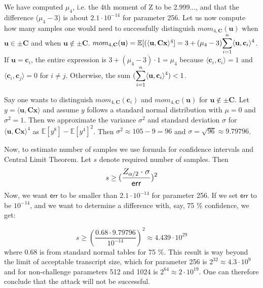 \documentclass[12 pt]{article}        	%
\newcommand{\mat}[1]{\mathbf{#1}}
\renewcommand{\vec}[1]{\mathbf{#1}}
\newcommand{\bb}[1]{\mathbb{#1}}
\begin{document}
We have computed $\mu_4$, i.e. the 4th moment of Z to be 2.999..., and that the difference ($\mu_4 - 3$) is about $2.1 \cdot 10^{-14}$ for parameter 256.
Let us now compute how many samples one would need to successfully distinguish $mom_{4, \mat{C}}(\vec{u})$ when $\vec{u} \in \pm \mat{C}$ and when $\vec{u} \not\in\pm\mat{C}$.
$mom_{4, \mat{C}}(\vec{u}) = \bb{E}[(\langle \vec{u}, \mat{C}\vec{x} \rangle ^4] = 3 + (\mu_4 - 3) \mathlarger{\sum_{i=1}^{n} \langle \vec{u}, \vec{c}_i \rangle ^4}$.
If $\vec{u} = \vec{c}_i$, the entire expression is $3 + (\mu_4 - 3)\cdot 1 = \mu_4$ because $\langle \vec{c}_i, \vec{c}_i \rangle = 1$ and $\langle \vec{c}_i, \vec{c}_j \rangle = 0$ for $i \neq j$. 
Otherwise, the sum $(\mathlarger{\sum_{i=1}^{n} \langle \vec{u}, \vec{c}_i \rangle ^4}) < 1$.


Say one wants to distinguish $mom_{4, \mat{C}}(\vec{c}_i)$ and $mom_{4, \mat{C}}(\vec{u})$ for $\vec{u} \not\in\pm\mat{C}$.
Let $y = \langle \vec{u}, \mat{C} \vec{x} \rangle$ and assume $y$ follows a standard normal distribution with $\mu = 0$ and $\sigma^2 = 1$.
Then we approximate the variance $\sigma^2$ and standard deviation $\sigma$ for $\langle \vec{u}, \mat{C}\vec{x} \rangle ^4$ as $\bb{E}[y^8] - \bb{E}[y^4]^2$.
Then $\sigma^2 \approx 105 - 9 = 96$ and $\sigma = \sqrt{96} \approx 9.79796$.

Now, to estimate number of samples we use formula for confidence intervals and Central Limit Theorem. Let $s$ denote required number of samples. Then 
\[
    s \geq \mathlarger{(\frac{Z_{\alpha/2} \cdot \sigma}{\mathsf{err}})^2}
\]
Now, we want $\mathsf{err}$ to be smaller than $2.1 \cdot 10^{-14}$ for parameter 256.
If we set $\mathsf{err}$ to be $10^{-14}$, and we want to determine a difference with, say, 75 \% confidence, we get:

\[
    s \geq (\frac{0.68 \cdot 9.79796}{10^{-14}})^2 \approx 4.439 \cdot 10^{29}
\]
where $0.68$ is from standard normal tables for 75 \%.
This result is way beyond the limit of acceptable transcript size, which for parameter 256 is $2^{32} \approx 4.3 \cdot 10^{9}$ and for non-challenge parameters 512 and 1024 is $2^{64} \approx 2 \cdot 10^{19}$.
One can therefore conclude that the attack will not be successful.
\end{document}
